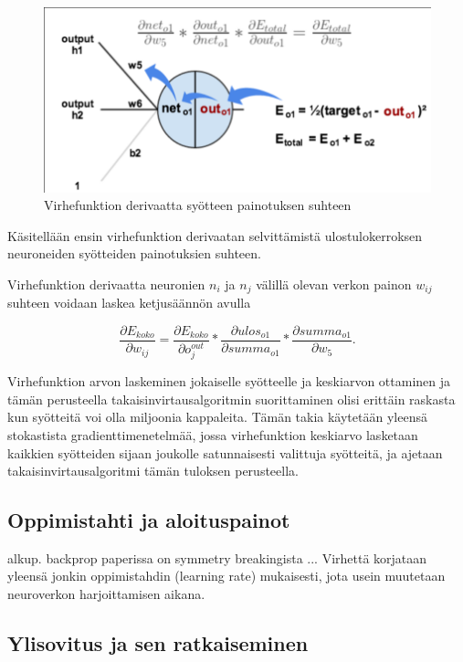 \documentclass[finnish]{tktltiki2}
\theoremstyle{definition}
\theoremstyle{remark}
\begin{document}
    \begin{figure}[h]
      \centering
      \includegraphics[scale=0.4]{chain-rule}
      \caption{Virhefunktion derivaatta syötteen painotuksen suhteen}
      \label{pic:chain-rule}
    \end{figure}

    Käsitellään ensin virhefunktion derivaatan selvittämistä ulostulokerroksen neuroneiden syötteiden painotuksien suhteen. 
    
    Virhefunktion derivaatta neuronien $n_i$ ja $n_j$ välillä olevan verkon painon $w_{ij}$ suhteen voidaan laskea ketjusäännön avulla

    $$ \frac{\partial E_{koko}}{\partial w_{ij}} = \frac{\partial E_{koko}}{\partial o_j^{out}} * \frac{\partial ulos_{o1}}{\partial summa_{o1}} * \frac{\partial summa_{o1}}{\partial w_5}. $$


    Virhefunktion arvon laskeminen jokaiselle syötteelle ja keskiarvon ottaminen ja tämän perusteella takaisinvirtausalgoritmin suorittaminen olisi erittäin raskasta kun syötteitä voi olla miljoonia kappaleita. Tämän takia käytetään yleensä stokastista gradienttimenetelmää, jossa virhefunktion keskiarvo lasketaan kaikkien syötteiden sijaan joukolle satunnaisesti valittuja syötteitä, ja ajetaan takaisinvirtausalgoritmi tämän tuloksen perusteella.

  \subsection{Oppimistahti ja aloituspainot}
  alkup. backprop paperissa on symmetry breakingista
  ...
  Virhettä korjataan yleensä jonkin oppimistahdin (learning rate) mukaisesti, jota usein muutetaan neuroverkon harjoittamisen aikana.

  \subsection{Ylisovitus ja sen ratkaiseminen}
\end{document}

